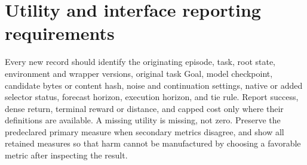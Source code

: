 \documentclass[11pt]{article}
\begin{document}
\section{Utility and interface reporting requirements}
\begin{table}[h]
\centering
\small
\resizebox{\linewidth}{!}{}
\caption{Generated archival finite-support panel. DINO uses the seed1 five-action
development bank and an added ranker. WorldAgen supplies three short roots
from one episode and no forecast-driven native selector; its zero three-step
task reward is a local metric observation, not evidence of full-task robustness.
Systems lacking eligible real continuation tables are excluded rather than
assigned zero bounds. The separate completed 30-root DINO confirmation is
reported in Table~\ref{tab:dino-prospective}.}
\end{table}
Every new record should identify the originating episode, task, root state,
environment and wrapper versions, original task Goal, model checkpoint,
candidate bytes or content hash, noise and continuation settings, native or
added selector status, forecast horizon, execution horizon, and tie rule.
Report success, dense return, terminal reward or distance, and capped cost
only where their definitions are available. A missing utility is missing,
not zero. Preserve the predeclared primary measure when secondary metrics
disagree, and show all retained measures so that harm cannot be manufactured
by choosing a favorable metric after inspecting the result.
\end{document}
